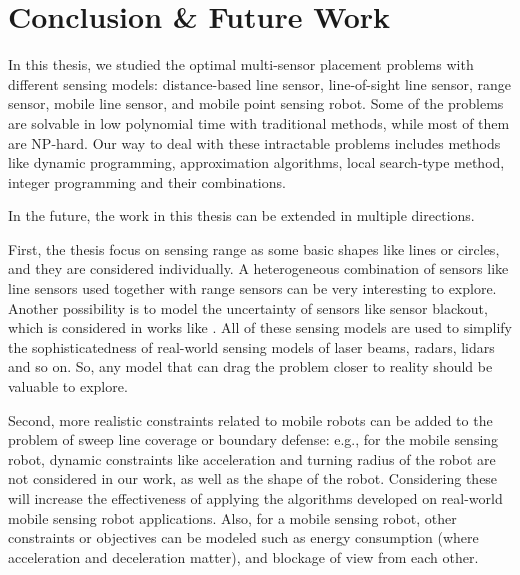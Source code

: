 
\chapter{Conclusion \& Future Work}
\thispagestyle{myheadings}
In this thesis, we studied the optimal multi-sensor placement problems with different sensing models:
distance-based line sensor, line-of-sight line sensor, range sensor, mobile line sensor, and mobile point sensing robot.
Some of the problems are solvable in low polynomial time with traditional methods, while most of them are NP-hard.
Our way to deal with these intractable problems includes methods like dynamic programming, approximation algorithms,
local search-type method, integer programming and their combinations. 

In the future, the work in this thesis can be extended in multiple directions.

First, the thesis focus on sensing range as some basic shapes like lines or circles, and they are considered individually.
A heterogeneous combination of sensors like line sensors used together with range sensors can be very interesting to explore.
Another possibility is to model the uncertainty of sensors like sensor blackout, which is considered in works like \cite{Olsen2022ICRA}.
All of these sensing models are used to simplify the sophisticatedness of real-world sensing models of laser beams, radars, lidars and so on.
So, any model that can drag the problem closer to reality should be valuable to explore.

Second, more realistic constraints related to mobile robots can be added to the problem of sweep line coverage or boundary defense: 
e.g., for the mobile sensing robot, dynamic constraints like acceleration and turning radius of the robot are not considered in our work, 
as well as the shape of the robot. 
Considering these will increase the effectiveness of applying the algorithms developed on real-world mobile sensing robot applications.
Also, for a mobile sensing robot, other constraints or objectives can be modeled such as energy consumption (where acceleration and deceleration matter), and
blockage of view from each other.

